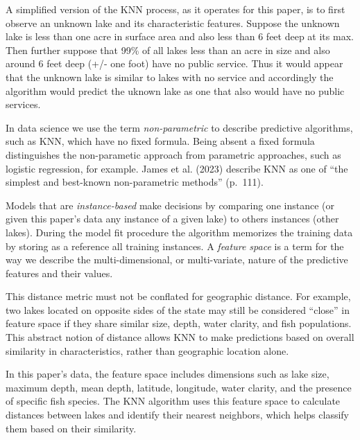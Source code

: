 \documentclass[
]{article}
\begin{document}
A simplified version of the KNN process, as it operates for this paper,
is to first observe an unknown lake and its characteristic features.
Suppose the unknown lake is less than one acre in surface area and also
less than 6 feet deep at its max. Then further suppose that 99\% of all
lakes less than an acre in size and also around 6 feet deep (+/- one
foot) have no public service. Thus it would appear that the unknown lake
is similar to lakes with no service and accordingly the algorithm would
predict the uknown lake as one that also would have no public services.

In data science we use the term \emph{non-parametric} to describe
predictive algorithms, such as KNN, which have no fixed formula. Being
absent a fixed formula distinguishes the non-parametic approach from
parametric approaches, such as logistic regression, for example. James
et al. (2023) describe KNN as one of ``the simplest and best-known
non-parametric methods'' (p.~111).

Models that are \emph{instance-based} make decisions by comparing one
instance (or given this paper's data any instance of a given lake) to
others instances (other lakes). During the model fit procedure the
algorithm memorizes the training data by storing as a reference all
training instances. A \emph{feature space} is a term for the way we
describe the multi-dimensional, or multi-variate, nature of the
predictive features and their values.

\begin{tcolorbox}[enhanced jigsaw, coltitle=black, toprule=.15mm, arc=.35mm, bottomtitle=1mm, opacityback=0, leftrule=.75mm, left=2mm, colframe=quarto-callout-note-color-frame, toptitle=1mm, titlerule=0mm, breakable, colbacktitle=quarto-callout-note-color!10!white, colback=white, bottomrule=.15mm, title=\textcolor{quarto-callout-note-color}{\faInfo}\hspace{0.5em}{Note}, rightrule=.15mm, opacitybacktitle=0.6]

This distance metric must not be conflated for geographic distance. For
example, two lakes located on opposite sides of the state may still be
considered ``close'' in feature space if they share similar size, depth,
water clarity, and fish populations. This abstract notion of distance
allows KNN to make predictions based on overall similarity in
characteristics, rather than geographic location alone.

\end{tcolorbox}

In this paper's data, the feature space includes dimensions such as lake
size, maximum depth, mean depth, latitude, longitude, water clarity, and
the presence of specific fish species. The KNN algorithm uses this
feature space to calculate distances between lakes and identify their
nearest neighbors, which helps classify them based on their similarity.
\end{document}
